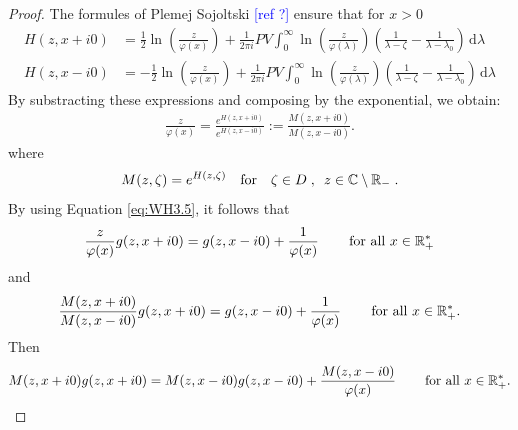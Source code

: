 \documentclass[11pt]{amsart}
\newcommand{\cte}{}
\newcommand{\diff}{\,\mathrm{d}}
\newcommand{\ndr}[1]{\textcolor{blue}{[#1]}}
\begin{document}
\begin{proof}
The formules of Plemej Sojoltski \ndr{ref ?} ensure that for $x > 0$
    \begin{align*}
        H(z,x+i0) &= \frac{1}{2} \ln\left(\frac{z}{\varphi(x)}\right) + \frac{1}{2\pi i} PV\int_0^\infty \ln\left(\frac{z}{\varphi(\lambda)}\right) \left( \frac{1}{\lambda-\zeta} - \frac{1}{\lambda-\lambda_0}\right) \diff \lambda\\
        H(z,x-i0) &= -\frac{1}{2} \ln\left(\frac{z}{\varphi(x)}\right) + \frac{1}{2\pi i} PV\int_0^\infty \ln\left(\frac{z}{\varphi(\lambda)}\right)\left( \frac{1}{\lambda-\zeta} - \frac{1}{\lambda-\lambda_0}\right) \diff \lambda
    \end{align*}
By substracting these expressions and composing by the exponential, we obtain:
\begin{align*}
    \frac{z}{\varphi(x)}
    = \frac{e^{H(z,x+i0)}}{e^{H(z,x-i0)}} 
    := \frac{M(z,x+i0)}{M(z,x-i0)}.
\end{align*}
where 
\begin{equation}
    M(z,\zeta) = e^{H(z,\zeta)}
    \quad \text{for} \quad
    \zeta \in D
    \; , \enspace z \in \mathbb{C} \setminus \mathbb{R}_- \; .
    \label{def:M}
\end{equation}
By using Equation \eqref{eq:WH3.5}, it follows that 
\begin{align*}
    \frac{z}{\varphi(x)} g(z, x+i0) = g(z, x-i0) + \frac{1}{\cte  \varphi(x)} \, \qquad \text{for all $x\in\RR_+^*$}
\end{align*}
and 
\begin{align*}
    \frac{M(z,x+i0)}{M(z,x-i0)} g(z, x+i0) = g(z, x-i0) + \frac{1}{\cte  \varphi(x)} \, \qquad \text{for all $x\in\RR_+^*$}.
\end{align*}
Then 
\begin{align*}
    M(z,x+i0)g(z, x+i0) = M(z,x-i0)g(z, x-i0) + \frac{M(z,x-i0)}{\cte  \varphi(x)} \, \qquad \text{for all $x\in\RR_+^*$}.
\end{align*}


\end{proof}
\end{document}
